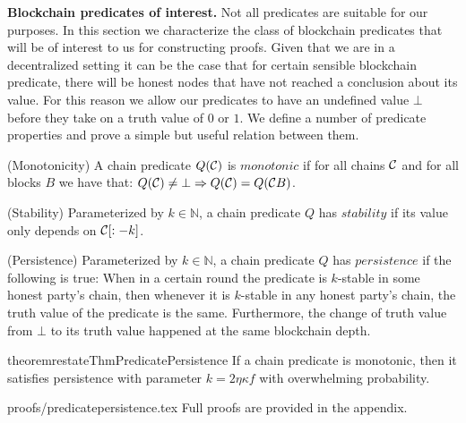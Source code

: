 

\medskip
\noindent
{\bf Blockchain predicates of interest.}
Not all predicates are suitable for our purposes. In this section we characterize the class of
blockchain predicates that will be of interest to us for constructing proofs.
Given that we are in a decentralized setting it can be the case that for certain
sensible blockchain predicate, there will be honest nodes that have not reached
a conclusion about its value. For this reason we allow our predicates to have an
undefined value $\bot$ before they take on a truth value of $0$ or $1$. We
define a number of predicate properties and prove a simple but useful relation
between them.

\begin{definition}{(Monotonicity)}
    A chain predicate $Q(\mathcal{C})$ is $\textit{monotonic}$ if for all chains
    $\mathcal{C}$ and for all blocks $B$ we have that:
    $Q(\mathcal{C}) \neq \bot \Rightarrow Q(\mathcal{C}) = Q(\mathcal{C} B)$.

\noindent 
 {(Stability)}
    Parameterized by $k \in \mathbb{N}$, a chain predicate
    $Q$ has $\textit{stability}$ if its value only depends on $\mathcal{C}[:-k]$.

\noindent 
{(Persistence)}
    Parameterized by $k \in \mathbb{N}$, a chain predicate
    $Q$ has $\textit{persistence}$ if the following is true: When in a certain
    round the predicate is $k$-stable in some honest party's chain, then
    whenever it is $k$-stable in any honest party's chain, the truth value of
    the predicate is the same. Furthermore, the change of truth value from
    $\bot$ to its  truth value happened at the same blockchain depth.
\end{definition}

\begin{restatable}{theorem}{restateThmPredicatePersistence}
    If a chain predicate is monotonic, then it satisfies persistence with
    parameter $k = 2\eta \kappa f$ with overwhelming probability.
\end{restatable}
\ifonecolumn
    {proofs/predicatepersistence.tex}
\else
    Full proofs are provided in the appendix.
\fi
